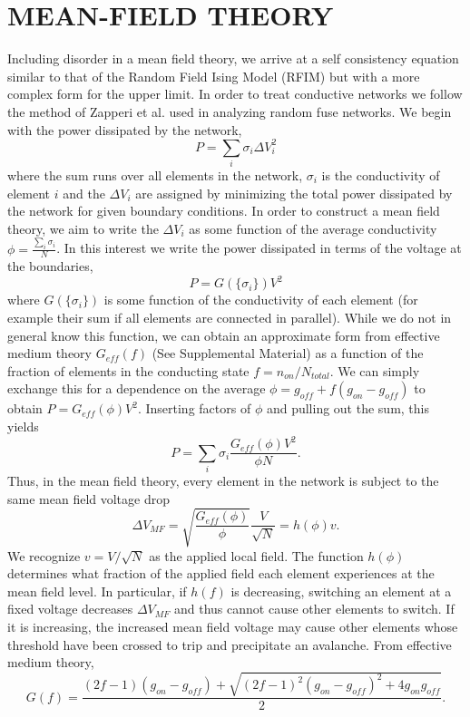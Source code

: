 \documentclass[aps,prl,preprint,groupedaddress]{revtex4-1}
\begin{document}
\section{MEAN-FIELD THEORY}

Including disorder in a mean field theory, we arrive at a self consistency
equation similar to that of the Random Field Ising Model (RFIM)
\cite{Sethna1993} but with a
more complex form for the upper limit. In order to treat conductive networks
we follow the method of Zapperi et al.
\cite{Zapperi1999} used in analyzing
random fuse networks.
We begin with the power dissipated by the network,
\[P = \sum_i \sigma_i \Delta V_i^2\]
where the sum runs over all elements in the network, $\sigma_i$ is the 
conductivity of element $i$  and the $\Delta V_i$ are assigned by minimizing
the total power dissipated by the network for given boundary conditions.
In order to construct a mean field theory, we aim to write the $\Delta V_i$ as
some function of the average conductivity $\phi = \frac{\sum_i \sigma_i}{N}$.
In this interest we  write the power dissipated in terms of the voltage at
the boundaries,
\[P = G(\{\sigma_i\}) V^2\]
where $G(\{\sigma_i\})$ is some function of the conductivity of each element
(for example their sum if all elements are connected in parallel). While we
do not in general know this function, we can obtain an approximate form
from effective medium theory $G_{eff}(f)$ (See Supplemental Material) as a
function of the fraction of
elements in the conducting state $f = n_{on}/N_{total}$. We can simply
exchange this for a dependence on the average
\(\phi = g_{off} + f(g_{on} - g_{off})\) to obtain
$P = G_{eff}(\phi) V^2$. Inserting factors of $\phi$ and pulling out the sum,
this yields
\[P = \sum_i \sigma_i \frac{G_{eff}(\phi)V^2}{\phi N}.\]
Thus, in the mean field theory, every element in the network is subject to
the same mean field voltage drop
\[\Delta V_{MF} = \sqrt{\frac{G_{eff}(\phi)}{\phi}}\frac{V}{\sqrt{N}}
= h(\phi) v.\]
We recognize $v=V/\sqrt{N}$ as the applied local field.  The function
$h(\phi)$ determines what fraction of the applied field each element
experiences at the mean field level.  In particular, if $h(f)$ is decreasing,
switching an element at a fixed voltage decreases $\Delta V_{MF}$ and
thus cannot cause other elements to switch.  If it is increasing, the
increased mean field voltage may cause other elements whose threshold have
been crossed to trip and precipitate an avalanche. From effective medium
theory,
\[G(f) = \frac{(2f-1)(g_{on} - g_{off}) + \sqrt{(2f-1)^2
(g_{on} - g_{off})^2+ 4g_{on}g_{off}}}{2}.\]
\end{document}
